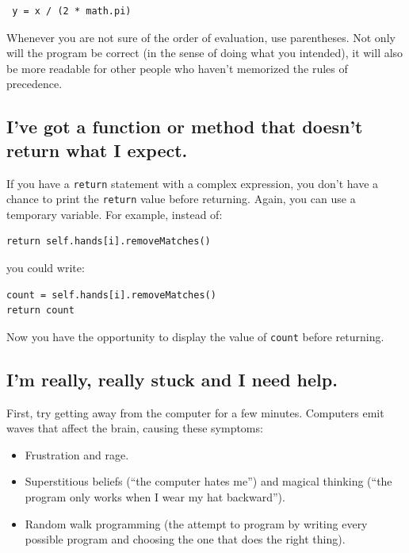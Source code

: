 \documentclass[10pt]{book}
\begin{document}
\begin{CJK}{UTF8}{gbsn}
\begin{verbatim}
 y = x / (2 * math.pi)
\end{verbatim}
%
Whenever you are not sure of the order of evaluation, use
parentheses.  Not only will the program be correct (in the sense
of doing what you intended), it will also be more readable for
other people who haven't memorized the rules of precedence.


\subsection{I've got a function or method that doesn't return what I
expect.}

If you have a {\tt return} statement with a complex expression,
you don't have a chance to print the {\tt return} value before
returning.  Again, you can use a temporary variable.  For
example, instead of:

\begin{verbatim}
return self.hands[i].removeMatches()
\end{verbatim}
%
you could write:

\begin{verbatim}
count = self.hands[i].removeMatches()
return count
\end{verbatim}
%
Now you have the opportunity to display the value of
{\tt count} before returning.


\subsection{I'm really, really stuck and I need help.}

First, try getting away from the computer for a few minutes.
Computers emit waves that affect the brain, causing these
symptoms:

\begin{itemize}

\item Frustration and rage.

\item Superstitious beliefs (``the computer hates me'') and
magical thinking (``the program only works when I wear my
hat backward'').

\item Random walk programming (the attempt to program by writing
every possible program and choosing the one that does the right
thing).


\end{itemize}
\end{CJK}
\end{document}
